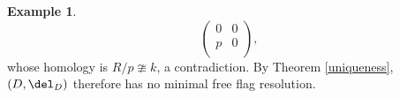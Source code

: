 \documentclass[12pt]{amsart}
\theoremstyle{definition}
\newtheorem{example}[lemma]{Example}
\theoremstyle{remark}
\def\on{\operatorname}
\begin{document}
\begin{example}
$$
\begin{pmatrix}
0 & 0 \\
p & 0 \\
\end{pmatrix},
$$
whose homology is $R/p \ncong k$, a contradiction. By Theorem \ref{uniqueness}, $(D, \del_D)$ therefore has no minimal free flag resolution.
\fi
\end{example}
\end{document}
